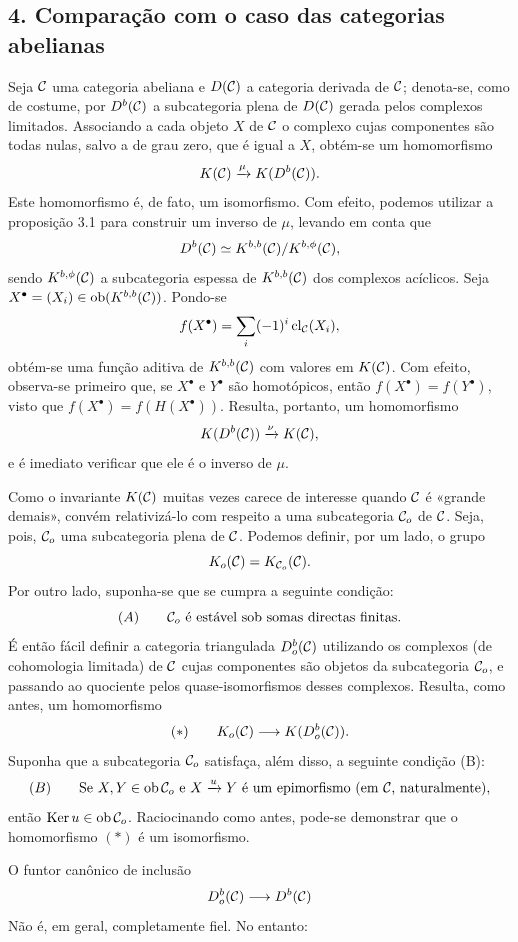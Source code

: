 \subsection*{4. Comparação com o caso das categorias abelianas}

Seja $\mathcal C$ uma categoria abeliana e $D(\mathcal C)$ a categoria derivada de $\mathcal C$; denota-se, como de costume, por $D^b(\mathcal C)$ a subcategoria plena de $D(\mathcal C)$ gerada pelos complexos limitados. Associando a cada objeto $X$ de $\mathcal C$ o complexo cujas componentes são todas nulas, salvo a de grau zero, que é igual a $X$, obtém-se um homomorfismo
\[
K(\mathcal C)\xrightarrow{\mu}K(D^b(\mathcal C)).
\]
Este homomorfismo é, de fato, um isomorfismo. Com efeito, podemos utilizar a proposição 3.1 para construir um inverso de $\mu$, levando em conta que
\[
D^b(\mathcal C)\simeq K^{b,b}(\mathcal C)/K^{b,\phi}(\mathcal C),
\]
sendo $K^{b,\phi}(\mathcal C)$ a subcategoria espessa de $K^{b,b}(\mathcal C)$ dos complexos acíclicos. Seja $X^\bullet=(X_i)\in\operatorname{ob}(K^{b,b}(\mathcal C))$. Pondo-se
\[
f(X^\bullet)=\sum_i(-1)^i\operatorname{cl}_{\mathcal C}(X_i),
\]
obtém-se uma função aditiva de $K^{b,b}(\mathcal C)$ com valores em $K(\mathcal C)$. Com efeito, observa-se primeiro que, se $X^\bullet$ e $Y^\bullet$ são homotópicos, então $f(X^\bullet)=f(Y^\bullet)$, visto que $f(X^\bullet)=f(H(X^\bullet))$. Resulta, portanto, um homomorfismo
\[
K(D^b(\mathcal C))\xrightarrow{\nu}K(\mathcal C),
\]
e é imediato verificar que ele é o inverso de $\mu$.

Como o invariante $K(\mathcal C)$ muitas vezes carece de interesse quando $\mathcal C$ é «grande demais», convém relativizá-lo com respeito a uma subcategoria $\mathcal C_o$ de $\mathcal C$. Seja, pois, $\mathcal C_o$ uma subcategoria plena de $\mathcal C$. Podemos definir, por um lado, o grupo
\[
K_o(\mathcal C)=K_{\mathcal C_o}(\mathcal C).
\]
Por outro lado, suponha-se que se cumpra a seguinte condição:
\[
(A)\qquad \mathcal C_o\text{ é estável sob somas directas finitas.}
\]
É então fácil definir a categoria triangulada $D_o^b(\mathcal C)$ utilizando os complexos (de cohomologia limitada) de $\mathcal C$ cujas componentes são objetos da subcategoria $\mathcal C_o$, e passando ao quociente pelos quase-isomorfismos desses complexos. Resulta, como antes, um homomorfismo
\[
(*)\qquad K_o(\mathcal C)\longrightarrow K(D_o^b(\mathcal C)).
\]
Suponha que a subcategoria $\mathcal C_o$ satisfaça, além disso, a seguinte condição (B):
\[
(B)\qquad
\text{Se }X,Y\in\operatorname{ob}\mathcal C_o\text{ e }X\xrightarrow{u}Y
\text{ é um epimorfismo (em }\mathcal C\text{, naturalmente)},
\]
então $\operatorname{Ker}u\in\operatorname{ob}\mathcal C_o$. Raciocinando como antes, pode-se demonstrar que o homomorfismo $(*)$ é um isomorfismo.

O funtor canônico de inclusão
\[
D_o^b(\mathcal C)\longrightarrow D^b(\mathcal C)
\]
Não é, em geral, completamente fiel. No entanto:
